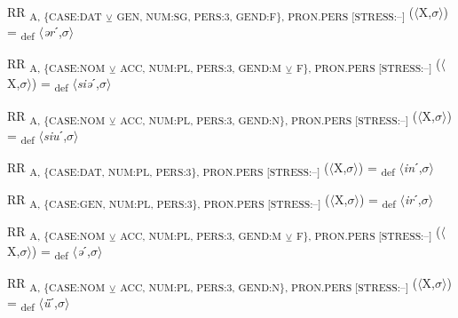 {\begin{exe}
 RR \textsubscript{A, \{CASE:DAT} \textsubscript{${\veebar}$}\textsubscript{ GEN, NUM:SG, PERS:3, GEND:F\}, PRON.PERS [STRESS:–]} ($\langle$X,$\sigma $$\rangle$) = \textsubscript{def} $\langle$\textit{ər}ˊ,$\sigma $$\rangle$
\end{exe}

\begin{exe}
 RR \textsubscript{A, \{CASE:NOM} \textsubscript{${\veebar}$}\textsubscript{ ACC, NUM:PL, PERS:3, GEND:M} \textsubscript{${\veebar}$}\textsubscript{ F\}, PRON.PERS [STRESS:–]} ($\langle$X,$\sigma $$\rangle$) = \textsubscript{def} $\langle$\textit{siə}ˊ,$\sigma $$\rangle$
\end{exe}

\begin{exe}
 RR \textsubscript{A, \{CASE:NOM} \textsubscript{${\veebar}$}\textsubscript{ ACC, NUM:PL, PERS:3, GEND:N\}, PRON.PERS [STRESS:–]} ($\langle$X,$\sigma $$\rangle$) = \textsubscript{def} $\langle$\textit{siu}ˊ,$\sigma $$\rangle$
\end{exe}

\begin{exe}
 RR \textsubscript{A, \{CASE:DAT, NUM:PL, PERS:3\}, PRON.PERS [STRESS:–]} ($\langle$X,$\sigma $$\rangle$) = \textsubscript{def} $\langle$\textit{in}ˊ,$\sigma $$\rangle$
\end{exe}

\begin{exe}
 RR \textsubscript{A, \{CASE:GEN, NUM:PL, PERS:3\}, PRON.PERS [STRESS:–]} ($\langle$X,$\sigma $$\rangle$) = \textsubscript{def} $\langle$\textit{ir}ˊ,$\sigma $$\rangle$
\end{exe}

\begin{exe}
 RR \textsubscript{A, \{CASE:NOM} \textsubscript{${\veebar}$}\textsubscript{ ACC, NUM:PL, PERS:3, GEND:M} \textsubscript{${\veebar}$}\textsubscript{ F\}, PRON.PERS [STRESS:–]} ($\langle$X,$\sigma $$\rangle$) = \textsubscript{def} $\langle$\textit{ə}ˊ,$\sigma $$\rangle$
\end{exe}

\begin{exe}
 RR \textsubscript{A, \{CASE:NOM} \textsubscript{${\veebar}$}\textsubscript{ ACC, NUM:PL, PERS:3, GEND:N\}, PRON.PERS [STRESS:–]} ($\langle$X,$\sigma $$\rangle$) = \textsubscript{def} $\langle$\textit{ǖ}ˊ,$\sigma $$\rangle$
\end{exe}

}
